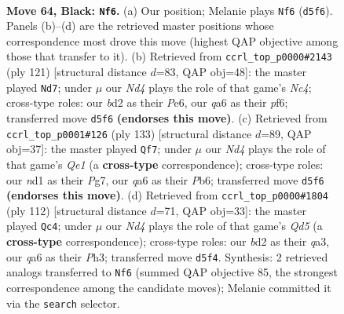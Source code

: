 \documentclass[11pt]{article}
\begin{document}
\clearpage

\begin{figure}[p]\centering
\begin{subfigure}{0.46\textwidth}\centering
\resizebox{\linewidth}{!}{%
\newchessgame
\chessboard[
  setfen={8/3qbrk1/Q7/P1pn1p1p/3p1Pp1/8/1R1BP2P/3N2K1 b - - 4 64},
  showmover=false,
  pgfstyle=straightmove, color=movearrow, markmove={d5-f6}
]}
\caption{}
\end{subfigure}\hfill
\begin{subfigure}{0.46\textwidth}\centering
\resizebox{\linewidth}{!}{%
\newchessgame
\chessboard[
  setfen={3rkq2/5p2/1p2pP2/pPn1p1Q1/4P3/1P5R/P5B1/6K1 b - - 2 61},
  showmover=false,
  pgfstyle=straightmove, color=movearrow, markmove={c5-d7}
]}
\caption{}
\end{subfigure}
\\[4pt]
\begin{subfigure}{0.46\textwidth}\centering
\resizebox{\linewidth}{!}{%
\newchessgame
\chessboard[
  setfen={4q1k1/p5p1/1p1b1r1p/1PpPp3/4P3/4B2P/4Q1PK/1R6 b - - 9 67},
  showmover=false,
  pgfstyle=straightmove, color=movearrow, markmove={e8-f7}
]}
\caption{}
\end{subfigure}\hfill
\begin{subfigure}{0.46\textwidth}\centering
\resizebox{\linewidth}{!}{%
\newchessgame
\chessboard[
  setfen={8/r4p1k/1p3Pp1/1P1QP3/7b/q5pP/4N1P1/1R3K2 w - - 1 57},
  showmover=false,
  pgfstyle=straightmove, color=movearrow, markmove={d5-c4}
]}
\caption{}
\end{subfigure}
\caption{\textbf{Move 64, Black: \texttt{Nf6}.} (a) Our position; Melanie plays \texttt{Nf6} (\texttt{d5f6}). Panels (b)--(d) are the retrieved master positions whose correspondence most drove this move (highest QAP objective among those that transfer to it). (b) Retrieved from \texttt{ccrl\_top\_p0000\#2143} (ply 121) [structural distance $d$=83, QAP obj=48]: the master played \texttt{Nd7}; under $\mu$ our \emph{Nd4} plays the role of that game's \emph{Nc4}; cross-type roles: our \emph{b}d2 as their \emph{P}e6, our \emph{q}a6 as their \emph{p}f6; transferred move \texttt{d5f6} \textbf{(endorses this move)}. (c) Retrieved from \texttt{ccrl\_top\_p0001\#126} (ply 133) [structural distance $d$=89, QAP obj=37]: the master played \texttt{Qf7}; under $\mu$ our \emph{Nd4} plays the role of that game's \emph{Qe1} (a \textbf{cross-type} correspondence); cross-type roles: our \emph{n}d1 as their \emph{P}g7, our \emph{q}a6 as their \emph{P}b6; transferred move \texttt{d5f6} \textbf{(endorses this move)}. (d) Retrieved from \texttt{ccrl\_top\_p0000\#1804} (ply 112) [structural distance $d$=71, QAP obj=33]: the master played \texttt{Qc4}; under $\mu$ our \emph{Nd4} plays the role of that game's \emph{Qd5} (a \textbf{cross-type} correspondence); cross-type roles: our \emph{b}d2 as their \emph{q}a3, our \emph{q}a6 as their \emph{P}h3; transferred move \texttt{d5f4}. Synthesis: 2 retrieved analogs transferred to \texttt{Nf6} (summed QAP objective 85, the strongest correspondence among the candidate moves); Melanie committed it via the \texttt{search} selector.}
\label{fig:thought-m127}
\end{figure}
\end{document}
